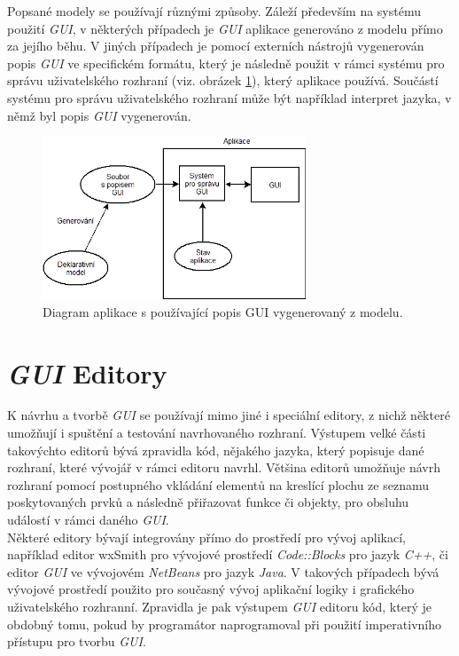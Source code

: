 \documentclass[11pt,twoside,a4paper]{book}
\begin{document}
Popsané modely se používají různými způsoby. Záleží především na systému použití \textit{GUI}, v některých případech je \textit{GUI} aplikace generováno z modelu přímo za jejího běhu. V jiných případech je pomocí externích nástrojů vygenerován popis \textit{GUI} ve specifickém formátu, který je následně použit v rámci systému pro správu uživatelského rozhraní (viz. obrázek \ref{fig:modelUse}), který aplikace používá. Součástí systému pro správu uživatelského rozhraní může být například interpret jazyka, v němž byl popis \textit{GUI} vygenerován. \cite{bib:model}\\

\begin{figure}[!ht]
\begin{center}
  \includegraphics[width=0.7\textwidth]{modelUse}
\caption{{\label{fig:modelUse}}Diagram aplikace s používající popis GUI vygenerovaný z modelu.}
\end{center}
\end{figure}

\section{\label{SEC:editGUI}\textit{GUI} Editory}
K návrhu a tvorbě \textit{GUI} se používají mimo jiné i speciální editory, z nichž některé umožňují i spuštění a testování navrhovaného rozhraní. Výstupem velké části takovýchto editorů bývá zpravidla kód, nějakého jazyka, který popisuje dané rozhraní, které vývojář v rámci editoru navrhl. Většina editorů umožňuje návrh rozhraní pomocí postupného vkládání elementů na kreslící plochu ze seznamu poskytovaných prvků a následně přiřazovat funkce či objekty, pro obsluhu událostí v rámci daného \textit{GUI}.\\
Některé editory bývají integrovány přímo do prostředí pro vývoj aplikací, například editor wxSmith pro vývojové prostředí \textit{Code::Blocks} pro jazyk \textit{C++}, či editor \textit{GUI} ve vývojovém \textit{NetBeans} pro jazyk \textit{Java}. V takových případech bývá vývojové prostředí použito pro současný vývoj aplikační logiky i grafického uživatelského rozhranní. Zpravidla je pak výstupem \textit{GUI} editoru kód, který je obdobný tomu, pokud by programátor naprogramoval při použití imperativního přístupu pro tvorbu \textit{GUI}.
\end{document}
